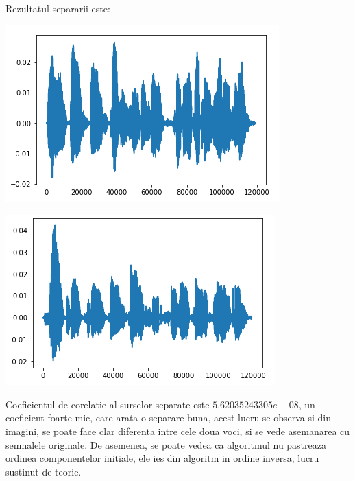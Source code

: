 \documentclass[12pt]{article}
\begin{document}
Rezultatul separarii este:
\begin{center}
	\includegraphics[scale=1]{speech_separated_1}
 \end{center}
\begin{center}
	\includegraphics[scale=1]{speech_separated_2}
 \end{center}

 Coeficientul de corelatie al surselor separate este $5.62035243305e-08$, un coeficient foarte mic, care arata o separare buna, acest lucru se observa si din imagini, se poate face clar diferenta intre cele doua voci, si se vede asemanarea cu semnalele originale. De asemenea, se poate vedea ca algoritmul nu pastreaza ordinea componentelor initiale, ele ies din algoritm in ordine inversa, lucru sustinut de teorie.
\end{document}
